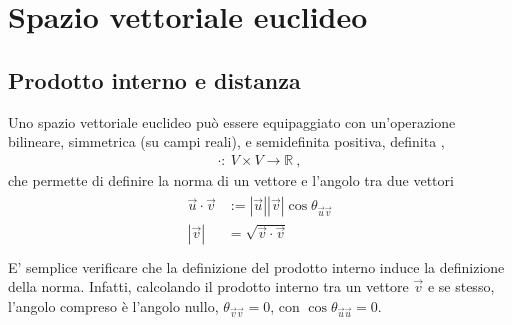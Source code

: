 \documentclass[letterpaper,10pt,english]{jupyterBook}
\begin{document}
\section{Spazio vettoriale euclideo}
\label{\detokenize{ch/algebra/vector-algebra-euclidean-space:spazio-vettoriale-euclideo}}\label{\detokenize{ch/algebra/vector-algebra-euclidean-space:math-hs-algebra-vector-euclidean-space}}\label{\detokenize{ch/algebra/vector-algebra-euclidean-space::doc}}
\sphinxAtStartPar
{}

\sphinxAtStartPar
{}


\subsection{Prodotto interno e distanza}
\label{\detokenize{ch/algebra/vector-algebra-euclidean-space:prodotto-interno-e-distanza}}
\sphinxAtStartPar
Uno spazio vettoriale euclideo può essere equipaggiato con un’operazione bilineare, simmetrica (su campi reali), e semi\sphinxhyphen{}definita positiva, definita ,
\begin{equation*}
\begin{split}\cdot: \ V \times V \rightarrow \mathbb{R} \ ,\end{split}
\end{equation*}
\sphinxAtStartPar
che permette di definire la norma di un vettore e l’angolo tra due vettori
\begin{equation*}
\begin{split}\begin{aligned}
  \vec{u} \cdot \vec{v} & := |\vec{u}||\vec{v}| \cos \theta_{\vec{u} \vec{v}}  \\
              |\vec{v}| & = \sqrt{\vec{v} \cdot \vec{v}}  \\
\end{aligned}\end{split}
\end{equation*}
\sphinxAtStartPar
E’ semplice verificare che la definizione del prodotto interno induce la definizione della norma. Infatti, calcolando il prodotto interno tra un vettore \(\vec{v}\) e se stesso, l’angolo compreso è l’angolo nullo, \(\theta_{\vec{v} \vec{v}} = 0\), con \(\cos \theta_{\vec{u}\vec{u}} = 0\).
\end{document}
